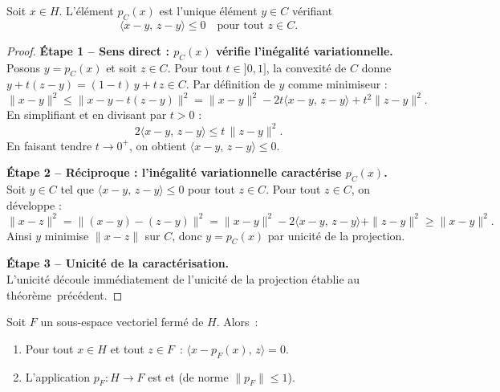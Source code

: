 \documentclass[11pt,a4paper]{article}
\begin{document}
\begin{proposition}
Soit $x \in H$. L'élément $p_C(x)$ est l'unique élément $y \in C$ vérifiant
\[
\langle x - y, \, z - y \rangle \leq 0 \quad \text{pour tout } z \in C.
\]
\end{proposition}

\begin{proof}
\noindent
\textbf{Étape 1 -- Sens direct : $p_C(x)$ vérifie l'inégalité variationnelle.}\\
Posons $y = p_C(x)$ et soit $z \in C$. Pour tout $t \in ]0, 1]$, la convexité de $C$
donne $y + t(z - y) = (1-t)\,y + t\,z \in C$. Par définition de $y$ comme minimiseur :
\[
\|x - y\|^2 \leq \|x - y - t(z - y)\|^2 = \|x - y\|^2 - 2t\langle x - y, \, z - y\rangle + t^2\|z - y\|^2.
\]
En simplifiant et en divisant par $t > 0$ :
\[
2\langle x - y, \, z - y\rangle \leq t\,\|z - y\|^2.
\]
En faisant tendre $t \to 0^+$, on obtient $\langle x - y, \, z - y\rangle \leq 0$.

\medskip
\textbf{Étape 2 -- Réciproque : l'inégalité variationnelle caractérise $p_C(x)$.}\\
Soit $y \in C$ tel que $\langle x - y, \, z - y\rangle \leq 0$ pour tout $z \in C$.
Pour tout $z \in C$, on développe :
\[
\|x - z\|^2 = \|(x - y) - (z - y)\|^2 = \|x - y\|^2 - 2\langle x - y, \, z - y\rangle + \|z - y\|^2 \geq \|x - y\|^2.
\]
Ainsi $y$ minimise $\|x - z\|$ sur $C$, donc $y = p_C(x)$ par unicité de la projection.

\medskip
\textbf{Étape 3 -- Unicité de la caractérisation.}\\
L'unicité découle immédiatement de l'unicité de la projection établie au théorème~précédent.
\end{proof}

\begin{proposition}
Soit $F$ un sous-espace vectoriel fermé de $H$. Alors~:
\begin{enumerate}
\item Pour tout $x \in H$ et tout $z \in F$~:
$\langle x - p_F(x), \, z \rangle = 0$.
\item L'application $p_F : H \to F$ est  et 
(de norme $\|p_F\| \leq 1$).
\end{enumerate}
\end{proposition}
\end{document}
